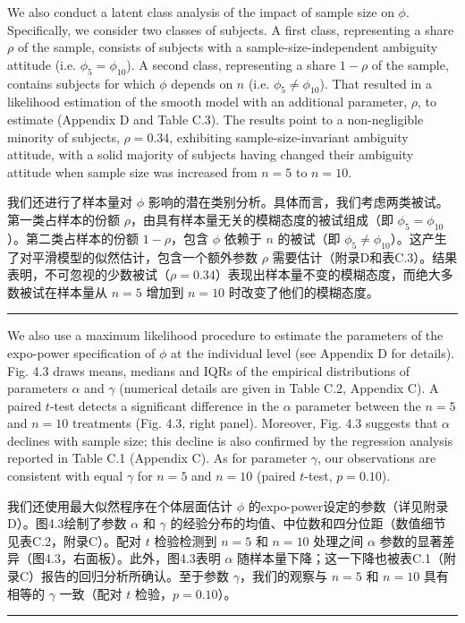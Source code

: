 \documentclass[12pt,a4paper]{article}
\newenvironment{original}
  {\par\vspace{0.5em}\noindent\color{black}\ignorespaces}
  {\par\vspace{0.3em}}
\newenvironment{translation}
  {\par\noindent\color{transblue}\ignorespaces}
  {\par\vspace{0.8em}\hrule\vspace{0.5em}}
\begin{document}
\begin{original}
We also conduct a latent class analysis of the impact of sample size on $\phi$. Specifically, we consider two classes of subjects. A first class, representing a share $\rho$ of the sample, consists of subjects with a sample-size-independent ambiguity attitude (i.e. $\phi_5 = \phi_{10}$). A second class, representing a share $1 - \rho$ of the sample, contains subjects for which $\phi$ depends on $n$ (i.e. $\phi_5 \neq \phi_{10}$). That resulted in a likelihood estimation of the smooth model with an additional parameter, $\rho$, to estimate (Appendix D and Table C.3). The results point to a non-negligible minority of subjects, $\rho = 0.34$, exhibiting sample-size-invariant ambiguity attitude, with a solid majority of subjects having changed their ambiguity attitude when sample size was increased from $n = 5$ to $n = 10$.
\end{original}

\begin{translation}
我们还进行了样本量对 $\phi$ 影响的潜在类别分析。具体而言，我们考虑两类被试。第一类占样本的份额 $\rho$，由具有样本量无关的模糊态度的被试组成（即 $\phi_5 = \phi_{10}$）。第二类占样本的份额 $1 - \rho$，包含 $\phi$ 依赖于 $n$ 的被试（即 $\phi_5 \neq \phi_{10}$）。这产生了对平滑模型的似然估计，包含一个额外参数 $\rho$ 需要估计（附录D和表C.3）。结果表明，不可忽视的少数被试（$\rho = 0.34$）表现出样本量不变的模糊态度，而绝大多数被试在样本量从 $n = 5$ 增加到 $n = 10$ 时改变了他们的模糊态度。
\end{translation}

\begin{original}
We also use a maximum likelihood procedure to estimate the parameters of the expo-power specification of $\phi$ at the individual level (see Appendix D for details). Fig. 4.3 draws means, medians and IQRs of the empirical distributions of parameters $\alpha$ and $\gamma$ (numerical details are given in Table C.2, Appendix C). A paired $t$-test detects a significant difference in the $\alpha$ parameter between the $n = 5$ and $n = 10$ treatments (Fig. 4.3, right panel). Moreover, Fig. 4.3 suggests that $\alpha$ declines with sample size; this decline is also confirmed by the regression analysis reported in Table C.1 (Appendix C). As for parameter $\gamma$, our observations are consistent with equal $\gamma$ for $n = 5$ and $n = 10$ (paired $t$-test, $p = 0.10$).
\end{original}

\begin{translation}
我们还使用最大似然程序在个体层面估计 $\phi$ 的expo-power设定的参数（详见附录D）。图4.3绘制了参数 $\alpha$ 和 $\gamma$ 的经验分布的均值、中位数和四分位距（数值细节见表C.2，附录C）。配对 $t$ 检验检测到 $n = 5$ 和 $n = 10$ 处理之间 $\alpha$ 参数的显著差异（图4.3，右面板）。此外，图4.3表明 $\alpha$ 随样本量下降；这一下降也被表C.1（附录C）报告的回归分析所确认。至于参数 $\gamma$，我们的观察与 $n = 5$ 和 $n = 10$ 具有相等的 $\gamma$ 一致（配对 $t$ 检验，$p = 0.10$）。
\end{translation}
\end{document}

